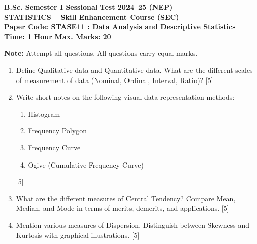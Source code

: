 \documentclass[11pt,a4paper]{article}
\begin{document}
\begin{center}
    {\Large   \textbf{B.Sc. Semester I Sessional Test 2024--25 (NEP)}}\\[4pt]
    {\large   \textbf{STATISTICS -- Skill Enhancement Course (SEC)}}\\[4pt]
   \textbf{Paper Code: STASE11 : Data Analysis and Descriptive Statistics}\\[6pt]
   \textbf{Time: 1 Hour} \hfill   \textbf{Max. Marks: 20}
\end{center}
\hr




\noindent   \textbf{Note:} Attempt all questions. All questions carry equal marks.


\begin{enumerate}[label=   \textbf{\arabic*.}]
    \item Define Qualitative data and Quantitative data. What are the different scales of measurement of data (Nominal, Ordinal, Interval, Ratio)? \hfill [5]
    \item Write short notes on the following visual data representation methods:
    
\begin{enumerate}[label=(\alph*)]
        \item Histogram
        \item Frequency Polygon
        \item Frequency Curve
        \item Ogive (Cumulative Frequency Curve)
    \end{enumerate} \hfill [5]
    \item What are the different measures of Central Tendency? Compare Mean, Median, and Mode in terms of merits, demerits, and applications. \hfill [5]
    \item Mention various measures of Dispersion. Distinguish between Skewness and Kurtosis with graphical illustrations. \hfill [5]
\end{enumerate}
\end{document}
